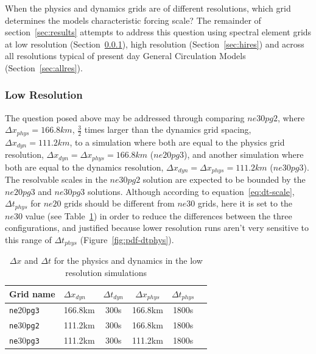 \documentclass{agujournal}
\begin{document}
When the physics and dynamics grids are of different resolutions, which grid determines the models characteristic forcing scale? The remainder of section~\ref{sec:results} attempts to address this question using spectral element grids at low resolution (Section~\ref{sec:lores}), high resolution (Section~\ref{sec:hires}) and across all resolutions typical of present day General Circulation Models (Section~\ref{sec:allres}).

\subsubsection{Low Resolution}\label{sec:lores}

The question posed above may be addressed through comparing $ne30pg2$, where $\Delta x_{phys} = 166.8km$, $\frac{3}{2}$ times larger than the dynamics grid spacing, $\Delta x_{dyn} = 111.2km$, to a simulation where both are equal to the physics grid resolution, $\Delta x_{dyn} = \Delta x_{phys} = 166.8 km$ ($ne20pg3$), and another simulation where both are equal to the dynamics resolution, $\Delta x_{dyn} = \Delta x_{phys} = 111.2 km$ ($ne30pg3$). The resolvable scales in the $ne30pg2$ solution are expected to be bounded by the $ne20pg3$ and $ne30pg3$ solutions. Although according to equation~\ref{eq:dt-scale}, $\Delta t_{phys}$ for $ne20$ grids should be different from $ne30$ grids, here it is set to the $ne30$ value (see Table~\ref{table:grids-lo}) in order to reduce the differences between the three configurations, and justified because lower resolution runs aren't very sensitive to this range of $\Delta t_{phys}$ (Figure~\ref{fig:pdf-dtphys}).

 \begin{table}
 \caption{$\Delta x$ and $\Delta t$ for the physics and dynamics in the low resolution simulations}
 \centering
 \begin{tabular}{llcccc}
 \hline
 Grid name & $\Delta x_{dyn}$  & $\Delta t_{dyn}$ & $\Delta x_{phys}$  & $\Delta t_{phys}$ \\
 \hline
   {\tt{ne}}20{\tt{pg3}}  & 166.8km & 300s  & 166.8km & 1800s \\
   {\tt{ne}}30{\tt{pg2}}  & 111.2km & 300s  & 166.8km & 1800s \\
   {\tt{ne}}30{\tt{pg3}}  & 111.2km & 300s  & 111.2km & 1800s \\
 \hline
 \end{tabular}
 \label{table:grids-lo}
 \end{table}
\end{document}
